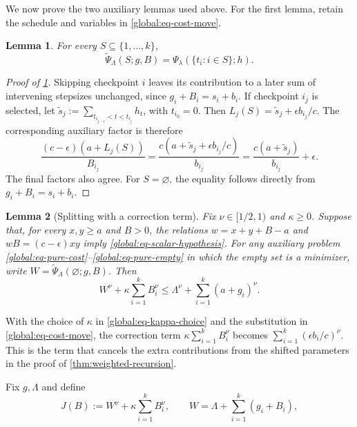 \documentclass[11pt,letterpaper]{article}
\newtheorem{lemma}[lemma]{Lemma}
\theoremstyle{definition}
\begin{document}
We now prove the two auxiliary lemmas used above.
For the first lemma, retain the schedule and variables in \eqref{global:eq-cost-move}.

\begin{lemma}
\label{global:prop-cost-preservation}
For every $S\subseteq\{1,\ldots,k\}$,
\begin{equation*}
  \widetilde\Psi_\Lambda(S;g,B)
  =\Psi_\lambda(\{t_i:i\in S\};h).
\end{equation*}
\end{lemma}


\begin{proof}[Proof of \cref{global:prop-cost-preservation}]
Skipping checkpoint $i$ leaves its contribution to a later sum of intervening stepsizes unchanged, since $g_i+B_i=s_i+b_i$.
If checkpoint $i_j$ is selected, let $\widetilde s_j:=\sum_{t_{i_{j-1}}<t<t_{i_j}}h_t$, with $t_{i_0}=0$.
Then $L_j(S)=\widetilde s_j+\epsilon b_{i_j}/c$.
The corresponding auxiliary factor is therefore
\[
  \frac{(c-\epsilon)(a+L_j(S))}{B_{i_j}}
  =\frac{c(a+\widetilde s_j+\epsilon b_{i_j}/c)}{b_{i_j}}
  =\frac{c(a+\widetilde s_j)}{b_{i_j}}+\epsilon.
\]
The final factors also agree.
For $S=\varnothing$, the equality follows directly from $g_i+B_i=s_i+b_i$.
\end{proof}

\begin{lemma}[Splitting with a correction term]
\label{lem:weighted-splitting}
Fix $\nu\in[1/2,1)$ and $\kappa\ge0$.
Suppose that, for every $x,y\ge a$ and $B>0$, the relations $w=x+y+B-a$ and $wB=(c-\epsilon) xy$ imply \eqref{global:eq-scalar-hypothesis}.
For any auxiliary problem \eqref{global:eq-pure-cost}--\eqref{global:eq-pure-empty} in which the empty set is a minimizer, write $W=\widetilde\Psi_\Lambda(\varnothing;g,B)$.
Then
\begin{equation}
  W^\nu+\kappa\sum_{i=1}^kB_i^\nu
  \le\Lambda^\nu+\sum_{i=1}^k(a+g_i)^\nu.
  \label{global:eq-weighted-splitting}
\end{equation}
\end{lemma}

With the choice of $\kappa$ in \eqref{global:eq-kappa-choice} and the substitution in \eqref{global:eq-cost-move}, the correction term $\kappa\sum_{i=1}^k B_i^\nu$ becomes $\sum_{i=1}^k(\epsilon b_i/c)^\nu$.
This is the term that cancels the extra contributions from the shifted parameters in the proof of \cref{thm:weighted-recursion}.

Fix $g,\Lambda$ and define
\begin{equation}
  J(B):=W^\nu+\kappa\sum_{i=1}^kB_i^\nu,
  \qquad W=\Lambda+\sum_{i=1}^k(g_i+B_i),
  \label{global:eq-weighted-objective}
\end{equation}
\end{document}
